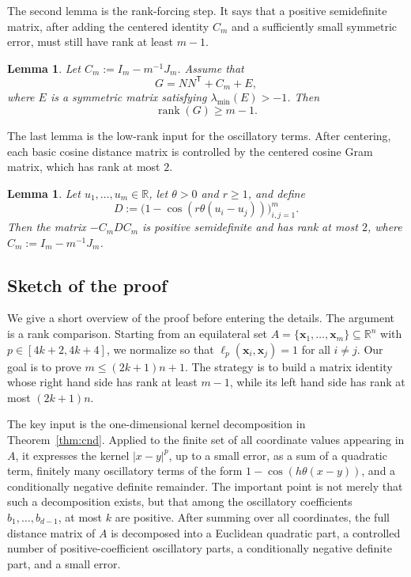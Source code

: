 \documentclass[11pt]{article}
\newtheorem{lemma}[theorem]{Lemma}
\theoremstyle{definition}
\begin{document}
The second lemma is the rank-forcing step. It says that a positive semidefinite
matrix, after adding the centered identity \(C_m\) and a sufficiently small
symmetric error, must still have rank at least \(m-1\).

\begin{lemma}\label{lem:rank2}
Let \(C_m:=I_m-m^{-1}J_m\). Assume that
\[
G=NN^{\mathsf T}+C_m+E,
\]
where \(E\) is a symmetric matrix satisfying \(\lambda_{\min}(E)>-1\). Then
\[
\operatorname{rank}(G)\ge m-1.
\]
\end{lemma}

The last lemma is the low-rank input for the oscillatory terms. After centering, each basic cosine distance matrix is controlled by the
centered cosine Gram matrix, which has rank at most \(2\).

\begin{lemma}\label{lem:rank d}
Let \(u_1,\dots,u_m\in\mathbb R\), let \(\theta>0\) and \(r\ge1\), and define
\[
D:=\bigl(1-\cos(r\theta(u_i-u_j))\bigr)_{i,j=1}^m.
\]
Then the matrix \(-C_mDC_m\) is positive semidefinite and has rank at most \(2\),
where \(C_m:=I_m-m^{-1}J_m\).
\end{lemma}


\subsection{Sketch of the proof}

We give a short overview of the proof before entering the details. The argument is a rank comparison. Starting from an equilateral set
\(
A=\{\boldsymbol{x}_1,\dots,\boldsymbol{x}_m\}\subseteq\mathbb R^n
\)
with \(p\in[4k+2,4k+4]\), we normalize so that
\(
\ell_p(\boldsymbol{x}_i,\boldsymbol{x}_j)=1
\)
for all \(i\ne j\). Our goal is to prove
\(
m\le (2k+1)n+1.
\)
The strategy is to build a matrix identity whose right hand side has rank at least \(m-1\), while its left hand side has rank at most \((2k+1)n\).

The key input is the one-dimensional kernel decomposition in Theorem~\ref{thm:cnd}. Applied to the finite set of all coordinate values appearing in \(A\), it expresses the kernel \(|x-y|^p\), up to a small error, as a sum of a quadratic term, finitely many oscillatory terms of the form \(1-\cos(h\theta(x-y))\), and a conditionally negative definite remainder. The important point is not merely that such a decomposition exists, but that among the oscillatory coefficients \(b_1,\dots,b_{d-1}\), at most \(k\) are positive. After summing over all coordinates, the full distance matrix of \(A\) is decomposed into a Euclidean quadratic part, a controlled number of positive-coefficient oscillatory parts, a conditionally negative definite part, and a small error.
\end{document}
